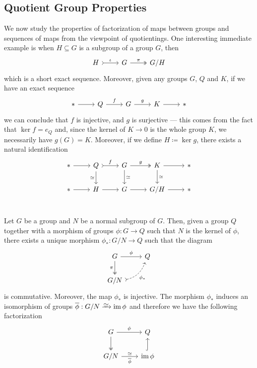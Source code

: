 \subsection{Quotient Group Properties}

We now study the properties of factorization of maps between groups and
sequences of maps from the viewpoint of quotientings. One interesting immediate
example is when \(H \subseteq G\) is a subgroup of a group \(G\), then
\[
    \begin{tikzcd}
        H \ar[r, tail, "\iota"] &G \ar[r, two heads, "\pi"] &G/H
    \end{tikzcd}
\]
which is a short exact sequence. Moreover, given any groups \(G\), \(Q\) and
\(K\), if we have an exact sequence
\[
    \begin{tikzcd}
        * \ar[r] &Q \ar[r, "f"] &G \ar[r, "g"] &K \ar[r] &*
    \end{tikzcd}
\]
we can conclude that \(f\) is injective, and \(g\) is surjective --- this comes
from the fact that \(\ker f = e_Q\) and, since the kernel of \(K \to 0\) is the
whole group \(K\), we necessarily have \(g(G) = K\). Moreover, if we define \(H
\coloneq \ker g\), there exists a natural identification
\[
    \begin{tikzcd}
        * \ar[r]
        &Q \ar[d, swap, "\iso"] \ar[r, tail, "f"]
        &G \ar[r, two heads, "g"] \ar[d, "\iso"]
        &K \ar[r] \ar[d, "\iso"]
        &* \\
        * \ar[r] &H \ar[r] &G \ar[r] &G/H \ar[r] &* \\
    \end{tikzcd}
\]

\begin{proposition}
    \label{prop:universal-property-quotients-grp}
    Let \(G\) be a group and \(N\) be a normal subgroup of \(G\). Then, given a
    group \(Q\) together with a morphism of groups \(\phi: G \to Q\) such that
    \(N\) is the kernel of \(\phi\), there exists a unique morphism
    \(\phi_{*}: G/N \to Q\) such that the diagram
    \[
        \begin{tikzcd}
            G \ar[d, two heads, swap, "\pi"] \ar[r, "\phi"] &Q \\
            G/N \ar[ur, dashed, swap, bend right, tail, "\phi_{*}"] &
        \end{tikzcd}
    \]
    is commutative. Moreover, the map \(\phi_*\) is injective. The morphism
    \(\phi_{*}\) induces an isomorphism of groups
    \(\overline{\phi}: G/N \isoto \im \phi\) and therefore we have the following
    factorization
    \[
        \begin{tikzcd}
            G \ar[d, two heads] \ar[r, "\phi"] &Q \\
            G/N \ar[r, "\overline{\phi}"', "\dis"]
            &\im \phi \ar[u, hook]
        \end{tikzcd}
    \]
\end{proposition}

